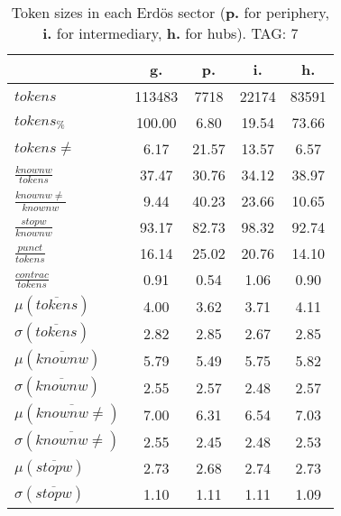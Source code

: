 \begin{table}[h!]
\begin{center}
\begin{tabular}{| l || c | c | c | c |}\hline
 & {\bf g.} & {\bf p.} & {\bf i.} & {\bf h.} \\\hline\hline
$tokens$ & 113483  & 7718  & 22174  & 83591 \\
$tokens_{\%}$ & 100.00  & 6.80  & 19.54  & 73.66 \\
$tokens \neq$ & 6.17  & 21.57  & 13.57  & 6.57 \\\hline
$\frac{knownw}{tokens}$ & 37.47  & 30.76  & 34.12  & 38.97 \\
$\frac{knownw \neq}{knownw}$ & 9.44  & 40.23  & 23.66  & 10.65 \\\hline
$\frac{stopw}{knownw}$ & 93.17  & 82.73  & 98.32  & 92.74 \\
$\frac{punct}{tokens}$ & 16.14  & 25.02  & 20.76  & 14.10 \\
$\frac{contrac}{tokens}$ & 0.91  & 0.54  & 1.06  & 0.90 \\\hline\hline
$\mu(\overline{tokens})$ & 4.00  & 3.62  & 3.71  & 4.11 \\
$\sigma(\overline{tokens})$ & 2.82  & 2.85  & 2.67  & 2.85 \\\hline
$\mu(\overline{knownw})$ & 5.79  & 5.49  & 5.75  & 5.82 \\
$\sigma(\overline{knownw})$ & 2.55  & 2.57  & 2.48  & 2.57 \\\hline
$\mu(\overline{knownw \neq})$ & 7.00  & 6.31  & 6.54  & 7.03 \\
$\sigma(\overline{knownw \neq})$ & 2.55  & 2.45  & 2.48  & 2.53 \\\hline
$\mu(\overline{stopw})$ & 2.73  & 2.68  & 2.74  & 2.73 \\
$\sigma(\overline{stopw})$ & 1.10  & 1.11  & 1.11  & 1.09 \\\hline
\end{tabular}
\caption{Token sizes in each Erd\"os sector ({{\bf p.}} for periphery, {{\bf i.}} for intermediary, {{\bf h.}} for hubs). TAG: 7}
\end{center}
\end{table}